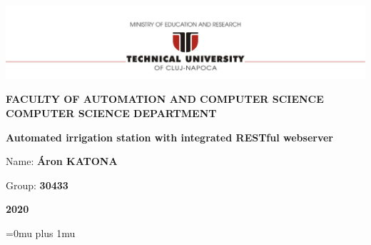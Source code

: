 \documentclass[12pt,a4paper,twoside]{report}
\renewcommand{\thesisauthor}{Áron KATONA}    %
\newcommand{\thesisauthorgroup}{30433}    %
\renewcommand{\thesisyear}{2020}      %
\renewcommand{\thesistitle}{Automated irrigation station with integrated RESTful webserver}
\newcommand{\department}{\bf FACULTY OF AUTOMATION AND COMPUTER SCIENCE\\
COMPUTER SCIENCE DEPARTMENT}
\newcommand{\utcnlogo}{\includegraphics[width=15cm]{img/tucn.jpg}}
\begin{document}

\newenvironment{definition}[1][Defini\c{t}ie.]{\begin{trivlist}
\item[\hskip \labelsep {\bfseries #1}]}{\end{trivlist}}





\begin{center}
\utcnlogo

\department

\vspace{4cm}

{\bf \thesistitle} %

\vspace{1.5cm}


\vspace{6cm}

Name: {\bf \thesisauthor} 

Group: {\bf \thesisauthorgroup}

\vspace{3cm}
{\bf \thesisyear}
\end{center}

\thispagestyle{empty}
\newpage

\setcounter{page}{1}



\tableofcontents
\newpage

\setcounter{page}{1}
\pagestyle{headings}

 

% 
% 
% 
% 

\Urlmuskip=0mu plus 1mu
 
\end{document}
